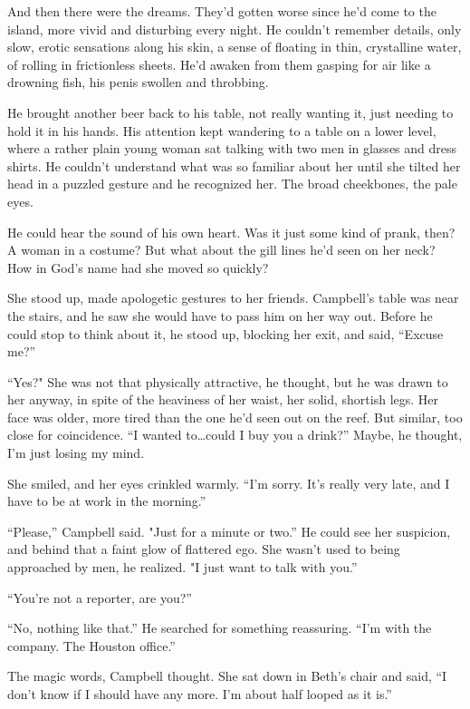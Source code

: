 And then there were the dreams. They'd gotten worse since he'd come to the island, more vivid and disturbing every night. He couldn't remember details, only slow, erotic sensations along his skin, a sense of floating in thin, crystalline water, of rolling in frictionless sheets. He'd awaken from them gasping for air like a drowning fish, his penis swollen and throbbing.

He brought another beer back to his table, not really wanting it, just needing to hold it in his hands. His attention kept wandering to a table on a lower level, where a rather plain young woman sat talking with two men in glasses and dress shirts. He couldn't understand what was so familiar about her until she tilted her head in a puzzled gesture and he recognized her. The broad cheekbones, the pale eyes.

He could hear the sound of his own heart. Was it just some kind of prank, then? A woman in a costume? But what about the gill lines he'd seen on her neck? How in God's name had she moved so quickly?

She stood up, made apologetic gestures to her friends. Campbell's table was near the stairs, and he saw she would have to pass him on her way out. Before he could stop to think about it, he stood up, blocking her exit, and said, ``Excuse me?''

``Yes?" She was not that physically attractive, he thought, but he was drawn to her anyway, in spite of the heaviness of her waist, her solid, shortish legs. Her face was older, more tired than the one he'd seen out on the reef. But similar, too close for coincidence. ``I wanted to\ldots could I buy you a drink?'' Maybe, he thought, I'm just losing my mind.

She smiled, and her eyes crinkled warmly. ``I'm sorry. It's really very late, and I have to be at work in the morning.''

``Please,'' Campbell said. "Just for a minute or two.'' He could see her suspicion, and behind that a faint glow of flattered ego. She wasn't used to being approached by men, he realized. "I just want to talk with you.''

``You're not a reporter, are you?''

``No, nothing like that.'' He searched for something reassuring. ``I'm with the company. The Houston office.''

The magic words, Campbell thought. She sat down in Beth's chair and said, ``I don't know if I should have any more. I'm about half looped as it is.''

